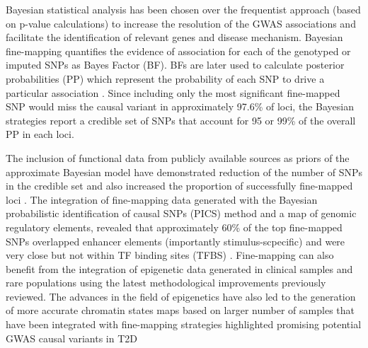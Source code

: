 Bayesian statistical analysis has been chosen over the frequentist approach (based on p-value calculations) to increase the resolution of the GWAS associations and facilitate the identification of relevant genes and disease mechanism. Bayesian fine-mapping quantifies the evidence of association for each of the genotyped or imputed SNPs as Bayes Factor (BF). BFs are later used to calculate posterior probabilities (PP) which represent the probability of each SNP to drive a particular association \parencite{Wakefield2007}. Since including only the most significant fine-mapped SNP would miss the causal variant in approximately 97.6\% of loci, the Bayesian strategies report a credible set of SNPs that account for 95 or 99\% of the overall PP in each loci\parencite{Bunt2015}. 
 

The inclusion of functional data from publicly available sources as priors of the approximate Bayesian model have demonstrated reduction of the number of SNPs in the credible set and also increased the proportion of successfully fine-mapped loci \parencite{Bunt2015, Kichaev2015}. The integration of fine-mapping data generated with the Bayesian probabilistic identification of causal SNPs (PICS) method and a map of genomic regulatory elements, revealed that approximately 60\% of the top fine-mapped SNPs overlapped enhancer elements (importantly stimulus-scpecific) and were very close but not within TF binding sites (TFBS) \parencite{Farh2015}. Fine-mapping can also benefit from the integration of epigenetic data generated in clinical samples and rare populations using the latest methodological improvements previously reviewed. The advances in the field of epigenetics have also led to the generation of more accurate chromatin states maps based on larger number of samples that have been integrated with fine-mapping strategies highlighted promising potential GWAS causal variants in T2D  



